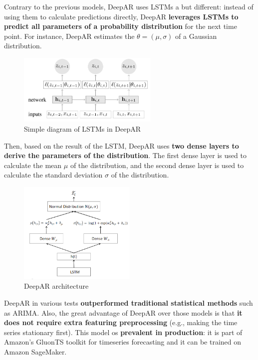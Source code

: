 Contrary to the previous models, DeepAR uses LSTMs a but different: instead of using them
to calculate predictions directly, DeepAR \textbf{leverages LSTMs to predict all parameters
of a probability distribution} for the next time point. For instance, DeepAR estimates
the $\theta = (\mu, \sigma)$ of a Gaussian distribution.

\begin{figure}[H]
    \centering
    \includegraphics[width=0.6\textwidth]{figures/lstm_deepar.png}
    \caption{Simple diagram of LSTMs in DeepAR}
    \label{fig:lstm_deepar}    
\end{figure}

Then, based on the result of the LSTM, DeepAR uses \textbf{two dense layers to
derive the parameters of the distribution}. The first dense layer is used to calculate
the mean $\mu$ of the distribution, and the second dense layer is used to calculate the 
standard deviation $\sigma$ of the distribution.

\begin{figure}[H]
    \centering
    \includegraphics[width=0.5\textwidth]{figures/deepar.png}
    \caption{DeepAR architecture}
    \label{fig:deepar}
\end{figure}

DeepAR in various tests \textbf{outperformed traditional statistical methods} such 
as ARIMA. Also, the great advantage of DeepAR over those models is that \textbf{it 
does not require extra featuring preprocessing} (e.g., making the time series stationary
first). This model os \textbf{prevalent in production}: it is part of Amazon's GluonTS
toolkit for timeseries forecasting and it can be trained on Amazon SageMaker.\\

